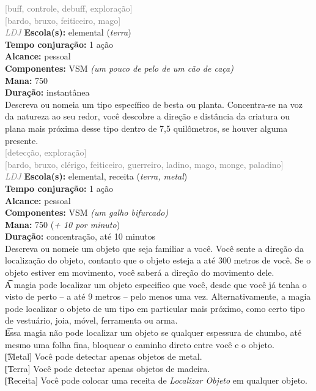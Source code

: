 \documentclass{RPG_Adventure}[2021/10/20]
\begin{document}
{\scriptsize \textcolor{gray}{[buff, controle, debuff, exploração]\\}}
{\scriptsize \textcolor{gray}{[bardo, bruxo, feiticeiro, mago]\\}}
{\tiny \textcolor{gray}{\textit{LDJ}}}
{\small \t \textbf{Escola(s):} elemental (\textit{terra})\\\t \textbf{Tempo conjuração:} 1 ação\\\t \textbf{Alcance:} pessoal\\\t \textbf{Componentes:} VSM \textit{(um pouco de pelo de um cão de caça)}\\\t \textbf{Mana:} 750\\\t \textbf{Duração:} instantânea\\}
{\normalsize Descreva ou nomeia um tipo específico de besta ou planta. Concentra-se na voz da natureza ao seu redor, você descobre a direção e distância da criatura ou plana mais próxima desse tipo dentro de 7,5 quilômetros, se houver alguma presente.\\}
{\scriptsize \textcolor{gray}{[detecção, exploração]\\}}
{\scriptsize \textcolor{gray}{[bardo, bruxo, clérigo, feiticeiro, guerreiro, ladino, mago, monge, paladino]\\}}
{\tiny \textcolor{gray}{\textit{LDJ}}}
{\small \t \textbf{Escola(s):} elemental, receita (\textit{terra, metal})\\\t \textbf{Tempo conjuração:} 1 ação\\\t \textbf{Alcance:} pessoal\\\t \textbf{Componentes:} VSM \textit{(um galho bifurcado)}\\\t \textbf{Mana:} 750 (\textit{+ 10 por minuto})\\\t \textbf{Duração:} concentração, até 10 minutos\\}
{\normalsize Descreva ou nomeie um objeto que seja familiar a você. Você sente a direção da localização do objeto, contanto que o objeto esteja a até 300 metros de você. Se o objeto estiver em movimento, você saberá a direção do movimento dele.\\\t A magia pode localizar um objeto especifico que você, desde que você já tenha o visto de perto – a até 9 metros – pelo menos uma vez. Alternativamente, a magia pode localizar o objeto de um tipo em particular mais próximo, como certo tipo de vestuário, joia, móvel, ferramenta ou arma.\\\t Essa magia não pode localizar um objeto se qualquer espessura de chumbo, até mesmo uma folha fina, bloquear o caminho direto entre você e o objeto.\\\t [Metal] Você pode detectar apenas objetos de metal.\\\t [Terra] Você pode detectar apenas objetos de madeira.\\\t [Receita] Você pode colocar uma receita de \textit{Localizar Objeto} em qualquer objeto.\\}
\end{document}
